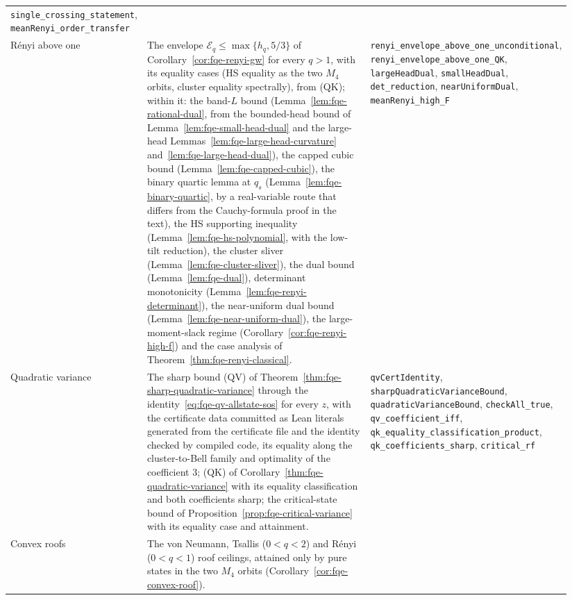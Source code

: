 {\begin{longtable}{@{}>{\raggedright\arraybackslash}p{0.14\linewidth}>{\raggedright\arraybackslash}p{0.49\linewidth}>{\raggedright\arraybackslash}p{0.31\linewidth}@{}}
\texttt{single\_crossing\_statement}, \texttt{meanRenyi\_order\_transfer}\\
R\'enyi above one &
The envelope $\mathcal E_q\le\max\{h_q,5/3\}$ of Corollary~\ref{cor:fqe-renyi-gw} for every $q>1$, with its equality cases (HS
equality as the two $M_4$ orbits, cluster equality spectrally), from (QK); within it: the band-$L$
bound (Lemma~\ref{lem:fqe-rational-dual}, from the bounded-head bound of Lemma~\ref{lem:fqe-small-head-dual} and the large-head
Lemmas~\ref{lem:fqe-large-head-curvature} and~\ref{lem:fqe-large-head-dual}), the capped cubic bound
(Lemma~\ref{lem:fqe-capped-cubic}), the binary quartic lemma at $q_s$ (Lemma~\ref{lem:fqe-binary-quartic}, by a real-variable route that differs from the
Cauchy-formula proof in the text), the HS supporting inequality (Lemma~\ref{lem:fqe-hs-polynomial}, with the low-tilt
reduction), the cluster sliver (Lemma~\ref{lem:fqe-cluster-sliver}), the dual bound (Lemma~\ref{lem:fqe-dual}), determinant
monotonicity (Lemma~\ref{lem:fqe-renyi-determinant}), the near-uniform dual bound (Lemma~\ref{lem:fqe-near-uniform-dual}), the
large-moment-slack regime (Corollary~\ref{cor:fqe-renyi-high-f}) and the case analysis of
Theorem~\ref{thm:fqe-renyi-classical}. &
\texttt{renyi\_envelope\_above\_\allowbreak one\_unconditional}, \texttt{renyi\_envelope\_above\_one\_QK}, \texttt{largeHeadDual}, \texttt{smallHeadDual}, \texttt{det\_reduction}, \texttt{nearUniformDual},
\texttt{meanRenyi\_high\_F}\\
Quadratic variance &
The sharp bound (QV) of Theorem~\ref{thm:fqe-sharp-quadratic-variance} through the identity~\eqref{eq:fqe-qv-allstate-sos}
for every $z$, with the certificate data committed as Lean literals generated from the certificate file and the identity
checked by compiled code, its equality along the cluster-to-Bell family
and optimality of the coefficient $3$; (QK) of Corollary~\ref{thm:fqe-quadratic-variance} with its equality classification
and both coefficients sharp; the critical-state bound of Proposition~\ref{prop:fqe-critical-variance} with its equality case
and attainment. &
\texttt{qvCertIdentity}, \texttt{sharpQuadraticVarianceBound}, \texttt{quadraticVarianceBound}, \texttt{checkAll\_true},
\texttt{qv\_coefficient\_iff}, \texttt{qk\_equality\_\allowbreak classification\_product}, \texttt{qk\_coefficients\_sharp}, \texttt{critical\_rf}\\
Convex roofs &
The von Neumann, Tsallis ($0<q<2$) and R\'enyi ($0<q<1$) roof ceilings, attained only by pure states in the two $M_4$
orbits (Corollary~\ref{cor:fqe-convex-roof}). &

\end{longtable}}
